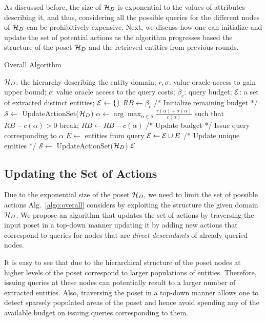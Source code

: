 As discussed before, the size of $\mathcal{H}_D$ is exponential to the values of attributes describing it, and thus, considering all the possible queries for the different nodes of $\mathcal{H}_D$ can be prohibitively expensive. Next, we discuss how one can initialize and update the set of potential actions as the algorithm progresses based the structure of the poset $\mathcal{H}_D$ and the retrieved entities from previous rounds. 

\begin{algorithm}[h]
\small\caption{Overall Algorithm}
\label{algo:overall}
\begin{algorithmic}[1]
 $\mathcal{H}_D$: the hierarchy describing the entity domain; $r,\sigma$: value oracle access to gain upper bound; $c$: value oracle access to the query costs; $\beta_c$: query budget;
 $\mathcal{E}$: a set of extracted distinct entities;
\STATE $\mathcal{E} \leftarrow \{\}$
\STATE $RB \leftarrow \beta_c$ /* Initialize remaining budget */
\STATE $\mathcal{S} \leftarrow$ {\sf UpdateActionSet($\mathcal{H}_D$)}
	\STATE $\alpha \leftarrow \arg\max_{\alpha \in {\mathcal{S}}} \frac{r(\alpha)+\sigma(\alpha)}{c(\alpha)}$ such that $RB - c(\alpha) >0$
		\STATE break;
	\ENDIF
	\STATE $RB \leftarrow RB - c(\alpha)$ /* Update budget */
	\STATE Issue query corresponding to $\alpha$
	\STATE $E \leftarrow$ entities from query
	\STATE $\mathcal{E} \leftarrow \mathcal{E} \cup E$ /* Update unique entities */
	\STATE $\mathcal{S} \leftarrow$ {\sf UpdateActionSet($\mathcal{H}_D$)}
\ENDWHILE
\RETURN $\mathcal{E}$
\end{algorithmic}
\end{algorithm}

\subsection{Updating the Set of Actions}
Due to the exponential size of the poset $\mathcal{H}_D$, we need to limit the set of possible actions Alg.~\ref{algo:overall} considers by exploiting the structure the given domain $\mathcal{H}_D$. We propose an algorithm that updates the set of actions by traversing the input poset in a top-down manner updating it by adding new actions that correspond to queries for nodes that are {\em direct descendants} of already queried nodes.

It is easy to see that due to the hierarchical structure of the poset nodes at higher levels of the poset correspond to larger populations of entities. Therefore, issuing queries at these nodes can potentially result to a larger number of extracted entities. Also, traversing the poset in a top-down manner allows one to detect sparsely populated areas of the poset and hence avoid spending any of the available budget on issuing queries corresponding to them.


